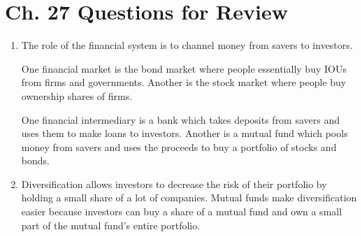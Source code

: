 \documentclass{article}
\begin{document}
\section*{Ch. 27 Questions for Review}

\begin{enumerate}

\item The role of the financial system is to channel money from savers to investors.

One financial market is the bond market where people essentially buy IOUs from firms and governments. Another is the stock market where people buy ownership shares of firms. 

One financial intermediary is a bank which takes deposits from savers and uses them to make loans to investors. Another is a mutual fund which pools money from savers and uses the proceeds to buy a portfolio of stocks and bonds. 

\item Diversification allows investors to decrease the risk of their portfolio by holding a small share of a lot of companies. Mutual funds make diversification easier because investors can buy a share of a mutual fund and own a small part of the mutual fund's entire portfolio.

\end{enumerate}
\end{document}
